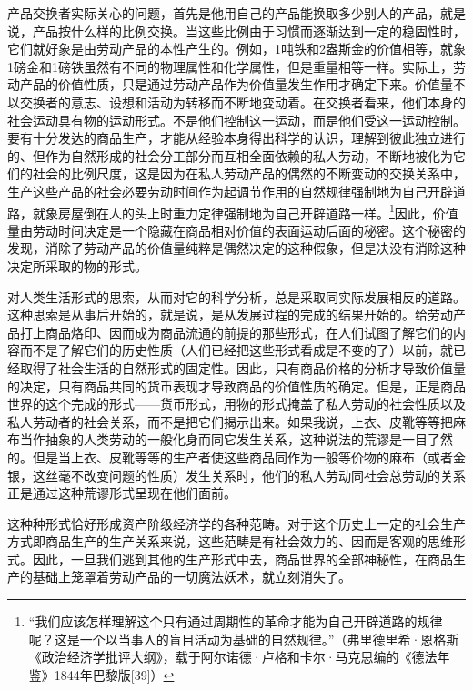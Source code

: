 \documentclass{ctexbook}
\begin{document}
    产品交换者实际关心的问题，首先是他用自己的产品能换取多少别人的产品，就是说，产品按什么样的比例交换。当这些比例由于习惯而逐渐达到一定的稳固性时，它们就好象是由劳动产品的本性产生的。例如，1吨铁和2盎斯金的价值相等，就象1磅金和1磅铁虽然有不同的物理属性和化学属性，但是重量相等一样。实际上，劳动产品的价值性质，只是通过劳动产品作为价值量发生作用才确定下来。价值量不以交换者的意志、设想和活动为转移而不断地变动着。在交换者看来，他们本身的社会运动具有物的运动形式。不是他们控制这一运动，而是他们受这一运动控制。要有十分发达的商品生产，才能从经验本身得出科学的认识，理解到彼此独立进行的、但作为自然形成的社会分工部分而互相全面依赖的私人劳动，不断地被化为它们的社会的比例尺度，这是因为在私人劳动产品的偶然的不断变动的交换关系中，生产这些产品的社会必要劳动时间作为起调节作用的自然规律强制地为自己开辟道路，就象房屋倒在人的头上时重力定律强制地为自己开辟道路一样。\footnote{“我们应该怎样理解这个只有通过周期性的革命才能为自己开辟道路的规律呢？这是一个以当事人的盲目活动为基础的自然规律。”（弗里德里希·恩格斯《政治经济学批评大纲》，载于阿尔诺德·卢格和卡尔·马克思编的《德法年鉴》1844年巴黎版[39]）}因此，价值量由劳动时间决定是一个隐藏在商品相对价值的表面运动后面的秘密。这个秘密的发现，消除了劳动产品的价值量纯粹是偶然决定的这种假象，但是决没有消除这种决定所采取的物的形式。
    
    对人类生活形式的思索，从而对它的科学分析，总是采取同实际发展相反的道路。这种思索是从事后开始的，就是说，是从发展过程的完成的结果开始的。给劳动产品打上商品烙印、因而成为商品流通的前提的那些形式，在人们试图了解它们的内容而不是了解它们的历史性质（人们已经把这些形式看成是不变的了）以前，就已经取得了社会生活的自然形式的固定性。因此，只有商品价格的分析才导致价值量的决定，只有商品共同的货币表现才导致商品的价值性质的确定。但是，正是商品世界的这个完成的形式——货币形式，用物的形式掩盖了私人劳动的社会性质以及私人劳动者的社会关系，而不是把它们揭示出来。如果我说，上衣、皮靴等等把麻布当作抽象的人类劳动的一般化身而同它发生关系，这种说法的荒谬是一目了然的。但是当上衣、皮靴等等的生产者使这些商品同作为一般等价物的麻布（或者金银，这丝毫不改变问题的性质）发生关系时，他们的私人劳动同社会总劳动的关系正是通过这种荒谬形式呈现在他们面前。
    
    这种种形式恰好形成资产阶级经济学的各种范畴。对于这个历史上一定的社会生产方式即商品生产的生产关系来说，这些范畴是有社会效力的、因而是客观的思维形式。因此，一旦我们逃到其他的生产形式中去，商品世界的全部神秘性，在商品生产的基础上笼罩着劳动产品的一切魔法妖术，就立刻消失了。
    
\end{document}
